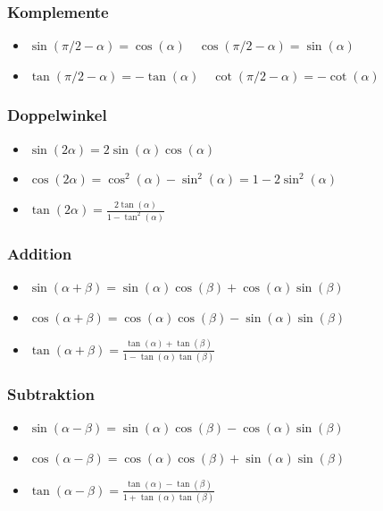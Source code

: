 \documentclass[8pt]{article}
\begin{document}
\begin{multicols*}{3}
\subsubsection{Komplemente}
\begin{itemize}
 \item $\sin(\pi/2 - \alpha) = \cos(\alpha) \quad \cos(\pi/2 - \alpha) = \sin(\alpha)$
 \item $\tan(\pi/2 - \alpha) = -\tan(\alpha) \quad \cot(\pi/2 - \alpha) = -\cot(\alpha)$
\end{itemize}

\subsubsection{Doppelwinkel}
\begin{itemize}
 \item $\sin(2\alpha) = 2 \sin(\alpha) \cos(\alpha)$
 \item $\cos(2\alpha) = \cos^2(\alpha) - \sin^2(\alpha) = 1 - 2 \sin^2(\alpha)$
 \item $\tan(2\alpha) = \frac{2\tan(\alpha)}{1 - \tan^2(\alpha)}$
\end{itemize}

\subsubsection{Addition}
\begin{itemize}
 \item $\sin(\alpha + \beta) = \sin(\alpha) \cos(\beta) + \cos(\alpha) \sin(\beta)$
 \item $\cos(\alpha + \beta) = \cos(\alpha) \cos(\beta) - \sin(\alpha) \sin(\beta)$
 \item $\tan(\alpha + \beta) = \frac{\tan(\alpha) + \tan(\beta)}{1 - \tan(\alpha) \tan(\beta)}$
\end{itemize}

\subsubsection{Subtraktion}
\begin{itemize}
 \item $\sin(\alpha - \beta) = \sin(\alpha) \cos(\beta) - \cos(\alpha)\sin(\beta)$
 \item $\cos(\alpha - \beta) = \cos(\alpha) \cos(\beta) + \sin(\alpha)\sin(\beta)$
 \item $\tan(\alpha - \beta) = \frac{\tan(\alpha) - \tan(\beta)}{1+\tan(\alpha) \tan(\beta)}$
\end{itemize}


\end{multicols*}
\end{document}
